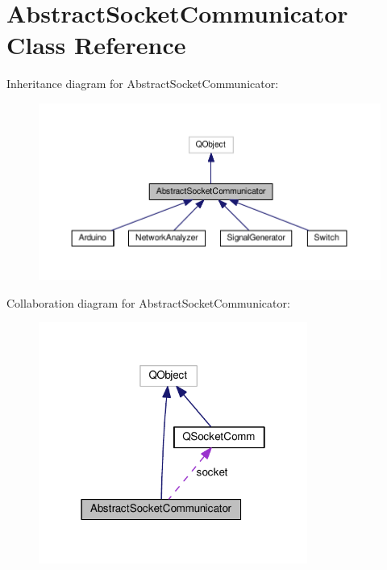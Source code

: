 \hypertarget{class_abstract_socket_communicator}{}\section{Abstract\+Socket\+Communicator Class Reference}
\label{class_abstract_socket_communicator}


Inheritance diagram for Abstract\+Socket\+Communicator\+:\nopagebreak
\begin{figure}[H]
\begin{center}
\leavevmode
\includegraphics[width=350pt]{class_abstract_socket_communicator__inherit__graph}
\end{center}
\end{figure}


Collaboration diagram for Abstract\+Socket\+Communicator\+:\nopagebreak
\begin{figure}[H]
\begin{center}
\leavevmode
\includegraphics[width=250pt]{class_abstract_socket_communicator__coll__graph}
\end{center}
\end{figure}
